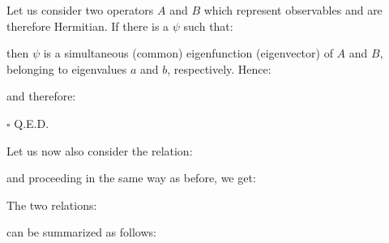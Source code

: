 	\begin{dem}
	Let us consider two operators $A$ and $B$ which represent observables and are therefore Hermitian. If there is a $\psi$ such that:
	
	then $\psi$ is a simultaneous (common) eigenfunction (eigenvector) of $A$ and $B$, belonging to eigenvalues $a$ and $b$, respectively. Hence:
	
	and therefore:
	
	\begin{flushright}
		$\square$  Q.E.D.
	\end{flushright}
	\end{dem}
	Let us now also consider the relation:
	
	and proceeding in the same way as before, we get:
	
	The two relations:
	
	can be summarized as follows:
	
